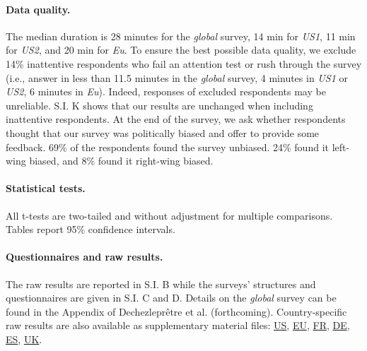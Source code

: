 \documentclass[12pt,english]{article}
\begin{document}
\begin{small}
\paragraph{\small Data quality.} %
The median duration is 28 minutes for the \textit{global} survey, 14 min for \textit{US1}, 11 min for \textit{US2}, and 20 min for \textit{Eu}. To ensure the best possible data quality, we exclude 14\% inattentive respondents who fail an attention test or rush through the survey (i.e., answer in less than 11.5 minutes in the \textit{global} survey, 4 minutes in \textit{US1} or \textit{US2}, 6 minutes in \textit{Eu}). Indeed, responses of excluded respondents may be unreliable. S.I. K 
shows that our results are unchanged when including inattentive respondents. %
At the end of the survey, we ask whether respondents thought that our survey was politically biased and offer to provide some feedback. 69\% of the respondents found the survey unbiased. 24\% found it left-wing biased, and 8\% found it right-wing biased.

\paragraph{\small Statistical tests.}
All t-tests are two-tailed and without adjustment for multiple comparisons. Tables report 95\% confidence intervals. 

\paragraph{\small Questionnaires and raw results.} %
The raw results are reported in S.I. B %
while the surveys' structures and questionnaires are given in S.I. C and D. %
Details on the \textit{global} survey can be found in the Appendix of Dechezleprêtre et al. (forthcoming).\citep{dechezlepretre_fighting_nodate} Country-specific raw results are also available as supplementary material files:  \href{https://github.com/bixiou/international_attitudes_toward_global_policies/raw/main/paper/app_desc_stats_US.pdf}{US}, \href{https://github.com/bixiou/international_attitudes_toward_global_policies/raw/main/paper/app_desc_stats_EU.pdf}{EU}, \href{https://github.com/bixiou/international_attitudes_toward_global_policies/raw/main/paper/app_desc_stats_FR.pdf}{FR}, \href{https://github.com/bixiou/international_attitudes_toward_global_policies/raw/main/paper/app_desc_stats_DE.pdf}{DE}, \href{https://github.com/bixiou/international_attitudes_toward_global_policies/raw/main/paper/app_desc_stats_ES.pdf}{ES}, \href{https://github.com/bixiou/international_attitudes_toward_global_policies/raw/main/paper/app_desc_stats_UK.pdf}{UK}. %

\end{small}
\end{document}
